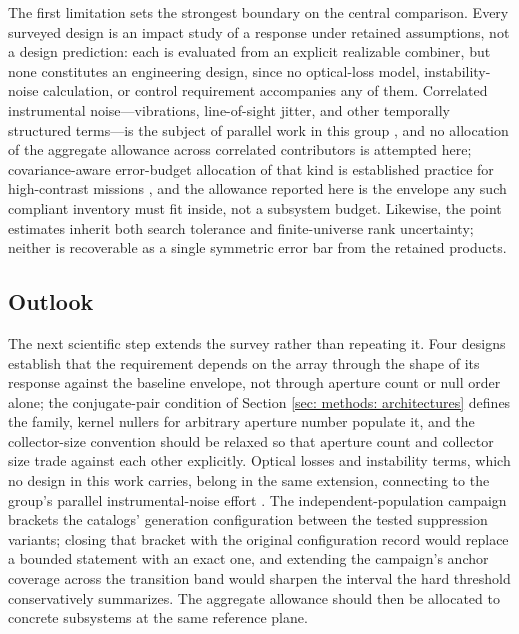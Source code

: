 \documentclass[12pt,a4paper]{article}
\numberwithin{equation}{section}
\numberwithin{figure}{section}
\numberwithin{table}{section}
\begin{document}
The first limitation sets the strongest boundary on the central comparison. Every surveyed design is an impact study of a response under retained assumptions, not a design prediction: each is evaluated from an explicit realizable combiner, but none constitutes an engineering design, since no optical-loss model, instability-noise calculation, or control requirement accompanies any of them. Correlated instrumental noise---vibrations, line-of-sight jitter, and other temporally structured terms---is the subject of parallel work in this group \cite{huber2024noise}, and no allocation of the aggregate allowance across correlated contributors is attempted here; covariance-aware error-budget allocation of that kind is established practice for high-contrast missions \cite{shaklan2005tpfc}, and the allowance reported here is the envelope any such compliant inventory must fit inside, not a subsystem budget. Likewise, the point estimates inherit both search tolerance and finite-universe rank uncertainty; neither is recoverable as a single symmetric error bar from the retained products.

\subsection{Outlook}
The next scientific step extends the survey rather than repeating it. Four designs establish that the requirement depends on the array through the shape of its response against the baseline envelope, not through aperture count or null order alone; the conjugate-pair condition of Section \ref{sec: methods: architectures} defines the family, kernel nullers for arbitrary aperture number \cite{laugier2020kernel} populate it, and the collector-size convention should be relaxed so that aperture count and collector size trade against each other explicitly. Optical losses and instability terms, which no design in this work carries, belong in the same extension, connecting to the group's parallel instrumental-noise effort \cite{huber2024noise}. The independent-population campaign brackets the catalogs' generation configuration between the tested suppression variants; closing that bracket with the original configuration record would replace a bounded statement with an exact one, and extending the campaign's anchor coverage across the transition band would sharpen the interval the hard threshold conservatively summarizes. The aggregate allowance should then be allocated to concrete subsystems at the same reference plane.
\end{document}
